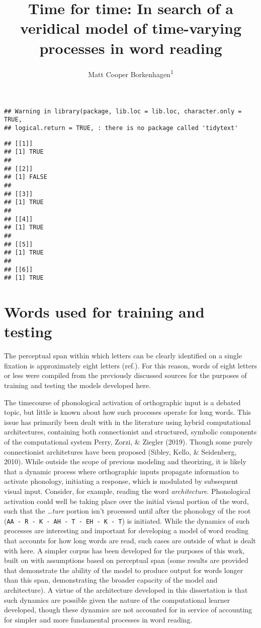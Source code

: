\documentclass[
  american,
  man,floatsintext]{apa6}
\title{Time for time: In search of a veridical model of time-varying processes in word reading}
\author{Matt Cooper Borkenhagen\textsuperscript{1}}
\date{}
\affiliation{\vspace{0.5cm}\textsuperscript{1} Department of Psychology, University of Wisconsin, Madison}
\begin{document}
\maketitle

\begin{verbatim}
## Warning in library(package, lib.loc = lib.loc, character.only = TRUE,
## logical.return = TRUE, : there is no package called 'tidytext'
\end{verbatim}

\begin{verbatim}
## [[1]]
## [1] TRUE
## 
## [[2]]
## [1] FALSE
## 
## [[3]]
## [1] TRUE
## 
## [[4]]
## [1] TRUE
## 
## [[5]]
## [1] TRUE
## 
## [[6]]
## [1] TRUE
\end{verbatim}

\hypertarget{words-used-for-training-and-testing}{%
\section{Words used for training and testing}\label{words-used-for-training-and-testing}}

The perceptual span within which letters can be clearly identified on a single fixation is approximately eight letters (ref.). For this reason, words of eight letters or less were compiled from the previously discussed sources for the purposes of training and testing the models developed here.

The timecourse of phonological activation of orthographic input is a debated topic, but little is known about how such processes operate for long words. This issue has primarily been dealt with in the literature using hybrid computational architectures, containing both connectionist and structured, symbolic components of the computational system Perry, Zorzi, \& Ziegler (2019). Though some purely connectionist architetures have been proposed (Sibley, Kello, \& Seidenberg, 2010). While outside the scope of previous modeling and theorizing, it is likely that a dynamic process where orthographic inputs propagate information to activate phonology, initiating a response, which is modulated by subsequent visual input. Consider, for example, reading the word \emph{architecture}. Phonological activation could well be taking place over the initial visual portion of the word, such that the \emph{\ldots ture} portion isn't processed until after the phonology of the root (\texttt{AA\ -\ R\ -\ K\ -\ AH\ -\ T\ -\ EH\ -\ K\ -\ T}) is initiated. While the dynamics of such processes are interesting and important for developing a model of word reading that accounts for how long words are read, such cases are outside of what is dealt with here. A simpler corpus has been developed for the purposes of this work, built on with assumptions based on perceptual span (some results are provided that demonstrate the ability of the model to produce output for words longer than this span, demonstrating the broader capacity of the model and architecture). A virtue of the architecture developed in this dissertation is that such dynamics are possible given the nature of the computational learner developed, though these dynamics are not accounted for in service of accounting for simpler and more fundamental processes in word reading.
\end{document}
